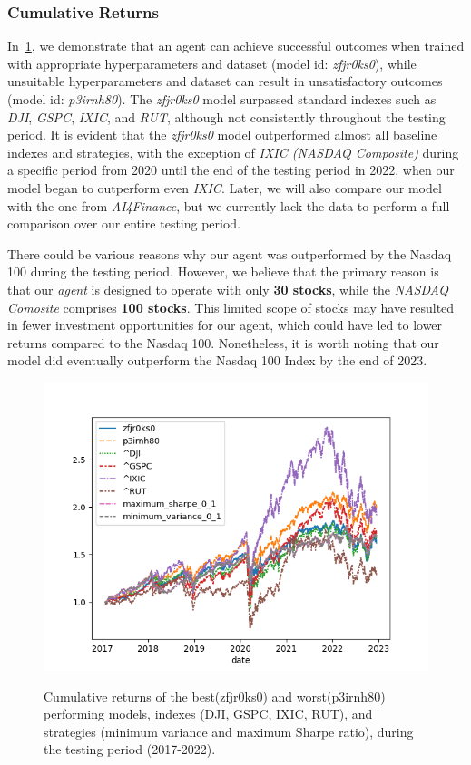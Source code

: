 \documentclass[../xlapes02]{subfiles}
\begin{document}
    \subsubsection{Cumulative Returns}
    In~\cref{fig:cumulative_return}, we demonstrate that an agent can achieve successful outcomes when trained with appropriate hyperparameters and dataset (model id: \emph{zfjr0ks0}), while unsuitable hyperparameters and dataset can result in unsatisfactory outcomes (model id: \emph{p3irnh80}). The \emph{zfjr0ks0} model surpassed standard indexes such as \emph{DJI}, \emph{GSPC}, \emph{IXIC}, and \emph{RUT}, although not consistently throughout the testing period. It is evident that the \emph{zfjr0ks0} model outperformed almost all baseline indexes and strategies, with the exception of \emph{IXIC (NASDAQ Composite)} during a specific period from 2020 until the end of the testing period in 2022, when our model began to outperform even \emph{IXIC}. Later, we will also compare our model with the one from \emph{AI4Finance}, but we currently lack the data to perform a full comparison over our entire testing period.

    There could be various reasons why our agent was outperformed by the Nasdaq 100 during the testing period. However, we believe that the primary reason is that our \emph{agent} is designed to operate with only \textbf{30 stocks}, while the \emph{NASDAQ Comosite} comprises \textbf{100 stocks}. This limited scope of stocks may have resulted in fewer investment opportunities for our agent, which could have led to lower returns compared to the Nasdaq 100. Nonetheless, it is worth noting that our model did eventually outperform the Nasdaq 100 Index by the end of 2023.
    \begin{figure}[h!]
        \centering
        \includegraphics[width=\linewidth]{image/figure/returns}
        \label{fig:cumulative_return}
        \caption{Cumulative returns of the best(zfjr0ks0) and worst(p3irnh80) performing models, indexes (DJI, GSPC, IXIC, RUT), and strategies (minimum variance and maximum Sharpe ratio), during the testing period (2017-2022).}
    \end{figure}
\end{document}
